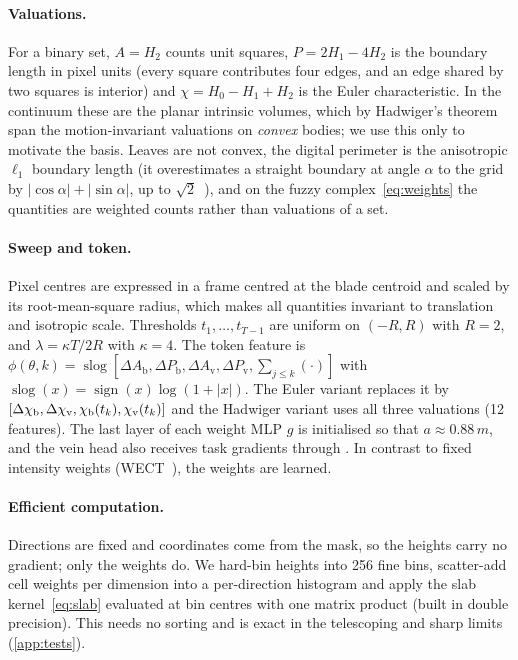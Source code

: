 \paragraph{Valuations.} For a binary set, $A=H_2$ counts unit squares, $P=2H_1-4H_2$ is the boundary
length in pixel units (every square contributes four edges, and an edge shared by two squares is
interior) and $\chi=H_0-H_1+H_2$ is the Euler characteristic. In the continuum these are the planar
intrinsic volumes, which by Hadwiger's theorem~\citep{hadwiger1957,klain1997} span the
motion-invariant valuations on \emph{convex} bodies; we use this only to motivate the basis. Leaves are
not convex, the digital perimeter is the anisotropic $\ell_1$ boundary length (it overestimates a
straight boundary at angle $\alpha$ to the grid by $|\cos\alpha|+|\sin\alpha|$, up to
$\sqrt2$~\citep{legland2007minkowski}), and on the fuzzy complex~\eqref{eq:weights} the quantities are
weighted counts rather than valuations of a set.

\paragraph{Sweep and token.} Pixel centres are expressed in a frame centred at the blade centroid and
scaled by its root-mean-square radius, which makes all quantities invariant to translation and
isotropic scale. Thresholds $t_1,\dots,t_{T-1}$ are uniform on $(-R,R)$ with $R{=}2$, and
$\lambda=\kappa T/2R$ with $\kappa{=}4$. The token feature is
$\phi(\theta,k)=\operatorname{slog}[\Delta A_{\mathrm b},\Delta P_{\mathrm b},\Delta A_{\mathrm v},
\Delta P_{\mathrm v},\sum_{j\le k}(\cdot)]$ with $\operatorname{slog}(x)=\operatorname{sign}(x)\log(1+|x|)$.
The Euler variant replaces it by $[\Delta\chi_{\mathrm b},\Delta\chi_{\mathrm v},\chi_{\mathrm b}(t_k),\chi_{\mathrm v}(t_k)]$
and the Hadwiger variant uses all three valuations (12 features). The last layer of each weight MLP $g$
is initialised so that $a\approx0.88\,m$, and the vein head also receives task gradients through \SVA{}.
In contrast to fixed intensity weights (WECT~\citep{cisewski2023wect}), the weights are learned.

\paragraph{Efficient computation.} Directions are fixed and coordinates come from the mask, so the
heights carry no gradient; only the weights do. We hard-bin heights into 256 fine bins, scatter-add cell
weights per dimension into a per-direction histogram and apply the slab kernel~\eqref{eq:slab} evaluated
at bin centres with one matrix product (built in double precision). This needs no sorting and is exact
in the telescoping and sharp limits (\cref{app:tests}).

